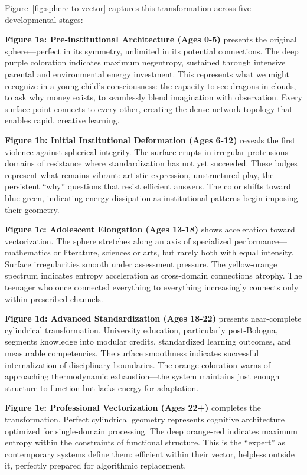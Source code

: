 Figure~\ref{fig:sphere-to-vector} captures this transformation across five developmental stages:

\textbf{Figure 1a: Pre-institutional Architecture (Ages 0-5)} presents the original sphere---perfect in its symmetry, unlimited in its potential connections. The deep purple coloration indicates maximum negentropy, sustained through intensive parental and environmental energy investment. This represents what we might recognize in a young child's consciousness: the capacity to see dragons in clouds, to ask why money exists, to seamlessly blend imagination with observation. Every surface point connects to every other, creating the dense network topology that enables rapid, creative learning.

\textbf{Figure 1b: Initial Institutional Deformation (Ages 6-12)} reveals the first violence against spherical integrity. The surface erupts in irregular protrusions---domains of resistance where standardization has not yet succeeded. These bulges represent what remains vibrant: artistic expression, unstructured play, the persistent ``why'' questions that resist efficient answers. The color shifts toward blue-green, indicating energy dissipation as institutional patterns begin imposing their geometry.

\textbf{Figure 1c: Adolescent Elongation (Ages 13-18)} shows acceleration toward vectorization. The sphere stretches along an axis of specialized performance---mathematics or literature, sciences or arts, but rarely both with equal intensity. Surface irregularities smooth under assessment pressure. The yellow-orange spectrum indicates entropy acceleration as cross-domain connections atrophy. The teenager who once connected everything to everything increasingly connects only within prescribed channels.

\textbf{Figure 1d: Advanced Standardization (Ages 18-22)} presents near-complete cylindrical transformation. University education, particularly post-Bologna, segments knowledge into modular credits, standardized learning outcomes, and measurable competencies. The surface smoothness indicates successful internalization of disciplinary boundaries. The orange coloration warns of approaching thermodynamic exhaustion---the system maintains just enough structure to function but lacks energy for adaptation.

\textbf{Figure 1e: Professional Vectorization (Ages 22+)} completes the transformation. Perfect cylindrical geometry represents cognitive architecture optimized for single-domain processing. The deep orange-red indicates maximum entropy within the constraints of functional structure. This is the ``expert'' as contemporary systems define them: efficient within their vector, helpless outside it, perfectly prepared for algorithmic replacement.


